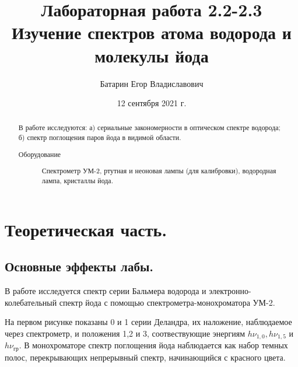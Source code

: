 \documentclass[%
 reprint,
 amsmath,amssymb,
 aps,
]{revtex4-2}
\begin{document}
\title{Лабораторная работа 2.2-2.3\\Изучение спектров атома водорода и молекулы йода}%



\author{Батарин Егор Владиславович}
%


\date{12 сентября 2021 г.}%
             

\begin{abstract}
В работе исследуются: а) сериальные закономерности в оптическом спектре водорода; б) спектр поглощения паров йода в видимой области.
\begin{description}
\item[Оборудование]
Спектрометр УМ-2, ртутная и неоновая лампы (для калибровки), водородная лампа, кристаллы йода.
\end{description}
\end{abstract}

\maketitle


\section{Теоретическая часть.}
\subsection{Основные эффекты лабы.}
В работе исследуется спектр серии Бальмера водорода и электронно-колебательный спектр йода с помощью спектрометра-монохроматора УМ-2.

 На первом рисунке показаны 0 и 1 серии Деландра, их наложение, наблюдаемое через спектрометр, и положения 1,2 и 3, соотвествующие энергиям $h\nu_{1,0},h\nu_{1,5}$ и $h\nu_\text{гр}$. В монохроматоре спектр поглощения йода наблюдается как набор темных полос, перекрывающих непрерывный спектр, начинающийся с красного цвета.
\end{document}
